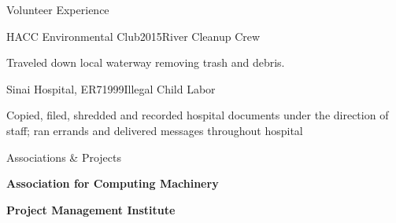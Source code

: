 \documentclass{resume} %
\begin{document}
\begin{rSection}{Volunteer Experience}

\begin{rWorkSubsection}{HACC Environmental Club}{2015}{River Cleanup Crew}{}
\item Traveled down local waterway removing trash and debris.
\end{rWorkSubsection}


\begin{rWorkSubsection}{Sinai Hospital, ER7}{1999}{Illegal Child Labor}{}
\item Copied, filed, shredded and recorded hospital documents under the direction of staff; ran errands and delivered messages throughout hospital
\end{rWorkSubsection}

\end{rSection}


\begin{rSection}{Associations \& Projects} \itemsep -2pt


\item {\bf Association for Computing Machinery}
\item {\bf Project Management Institute}


\end{rSection}

\end{document}
